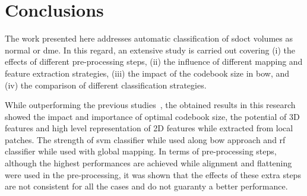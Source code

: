 \documentclass[review]{elsarticle}
\begin{document}
\maketitle

\linenumbers
\acresetall  %




%

\section{Conclusions}\label{sec:con}
The work presented here addresses automatic classification of \ac{sdoct} volumes as normal or \ac{dme}.
In this regard, an extensive study is carried out covering
(i) the effects of different pre-processing steps, 
(ii) the influence of different mapping and feature extraction strategies,
(iii) the impact of the codebook size in \ac{bow}, and
(iv) the comparison of different classification strategies.

While outperforming the previous studies~\cite{Lemaintre2015miccaiOCT,Venhuizen2015}, the obtained results in this research showed the impact and importance of optimal codebook size, the potential of 3D features and high level representation of 2D features while extracted from local patches.
The strength of \ac{svm} classifier while used along \ac{bow} approach and \ac{rf} classifier while used with global mapping.
In terms of pre-processing steps, although the highest performances are achieved while alignment and flattening were used in the pre-processing, it was shown that the effects of these extra steps are not consistent for all the cases and do not guaranty a better performance. 


\end{document}
